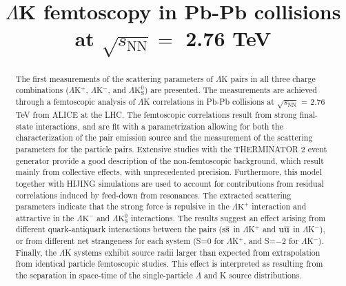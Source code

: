 \documentclass[ALICE,manyauthors]{cernphprep}
\newcommand{\LamK}{$\Lambda$K\xspace}
\newcommand{\LamKchP}{$\Lambda\mathrm{K^{+}}$\xspace}
\newcommand{\LamKchM}{$\Lambda\mathrm{K^{-}}$\xspace}
\newcommand{\LamKs}{$\Lambda\mathrm{K^{0}_{S}}$\xspace}
\begin{document}
%

\begin{titlepage}
%
%

\title{\LamK femtoscopy in Pb-Pb collisions at $\sqrt{s_{\mathrm{NN}}} = $ 2.76 TeV}
\ShortTitle{\LamK femtoscopy in Pb-Pb collisions}   %


\begin{abstract}
The first measurements of the scattering parameters of $\Lambda$K pairs in all three charge combinations ($\Lambda$K$^{+}$, $\Lambda$K$^{-}$, and $\Lambda\mathrm{K^{0}_{S}}$) are presented.
The measurements are achieved through a femtoscopic analysis of $\Lambda$K correlations in Pb-Pb collisions at $\sqrt{s_{\mathrm{NN}}}$ = 2.76 TeV from ALICE at the LHC.  
The femtoscopic correlations result from strong final-state interactions, and are fit with a parametrization allowing for both the characterization of the pair emission source and the measurement of the scattering parameters for the particle pairs.
Extensive studies with the THERMINATOR 2 event generator provide a good description of the non-femtoscopic background, which result mainly from collective effects, with unprecedented precision.
Furthermore, this model together with HIJING simulations are used to account for contributions from residual correlations induced by feed-down from resonances.
The extracted scattering parameters indicate that the strong force is repulsive in the \LamKchP interaction and attractive in the \LamKchM and \LamKs interactions.
The results suggest an effect arising from different quark-antiquark interactions between the pairs ($\rm s\overline{s}$ in $\Lambda$K$^{+}$ and $\rm u\overline{u}$ in $\Lambda$K$^{-}$), or from different net strangeness for each system (S=0 for $\Lambda$K$^{+}$, and S=$-2$ for $\Lambda$K$^{-}$).
Finally, the $\Lambda$K systems exhibit source radii larger than expected from extrapolation from identical particle femtoscopic studies.
This effect is interpreted as resulting from the separation in space-time of the single-particle $\Lambda$ and K source distributions.
\end{abstract}
\end{titlepage}
\setcounter{page}{2}
\end{document}

